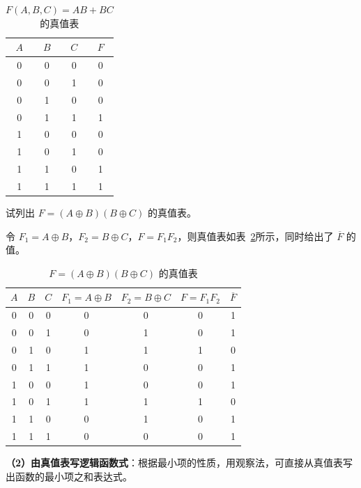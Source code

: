\begin{table}[H]
\centering
\caption{$F(A,B,C)=AB+BC$ 的真值表}
\label{tab:真值表:例F1}
\begin{tabular}{ccc|c}
	\toprule
	$A$ & $B$ & $C$ & $F$ \\
	\midrule
	0 & 0 & 0 & 0 \\
	0 & 0 & 1 & 0 \\
	0 & 1 & 0 & 0 \\
	0 & 1 & 1 & 1 \\
	1 & 0 & 0 & 0 \\
	1 & 0 & 1 & 0 \\
	1 & 1 & 0 & 1 \\
	1 & 1 & 1 & 1 \\
	\bottomrule
\end{tabular}
\end{table}

\begin{example}[由复合函数列真值表]
\label{ex:列真值表2}
试列出 $F=(A\oplus B)(B\oplus C)$ 的真值表。

\begin{solution}
	令 $F_1=A\oplus B$，$F_2=B\oplus C$，$F=F_1F_2$，则真值表如表~\ref{tab:真值表:例F2}所示，同时给出了 $\overline{F}$ 的值。
\end{solution}
\end{example}

\begin{table}[H]
\centering
\caption{$F=(A\oplus B)(B\oplus C)$ 的真值表}
\label{tab:真值表:例F2}
\begin{tabular}{ccc|cccc}
	\toprule
	$A$ & $B$ & $C$ & $F_1=A\oplus B$ & $F_2=B\oplus C$ & $F=F_1F_2$ & $\overline{F}$ \\
	\midrule
	0 & 0 & 0 & 0 & 0 & 0 & 1 \\
	0 & 0 & 1 & 0 & 1 & 0 & 1 \\
	0 & 1 & 0 & 1 & 1 & 1 & 0 \\
	0 & 1 & 1 & 1 & 0 & 0 & 1 \\
	1 & 0 & 0 & 1 & 0 & 0 & 1 \\
	1 & 0 & 1 & 1 & 1 & 1 & 0 \\
	1 & 1 & 0 & 0 & 1 & 0 & 1 \\
	1 & 1 & 1 & 0 & 0 & 0 & 1 \\
	\bottomrule
\end{tabular}
\end{table}

\textbf{（2）由真值表写逻辑函数式}：根据最小项的性质，用观察法，可直接从真值表写出函数的最小项之和表达式。

